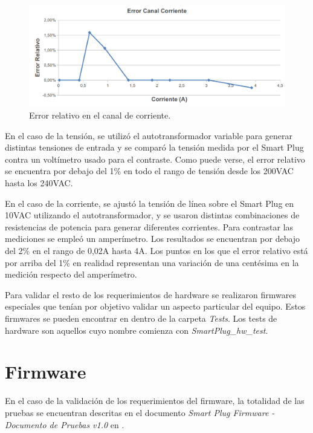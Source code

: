 \begin{figure}[h]
	\centering
	\includegraphics[width=14cm]{./Figures/4_1_1_error_canal_corriente.png}
	\caption{Error relativo en el canal de corriente.}
	\label{fig:error_canal_corriente}
\end{figure}

En el caso de la tensión, se utilizó el autotransformador variable para generar distintas tensiones de entrada y se comparó la tensión medida por el Smart Plug contra un voltímetro usado para el contraste. Como puede verse, el error relativo se encuentra por debajo del 1\% en todo el rango de tensión desde los 200VAC hasta los 240VAC.

En el caso de la corriente, se ajustó la tensión de línea sobre el Smart Plug en 10VAC utilizando el autotransformador, y se usaron distintas combinaciones de resistencias de potencia para generar diferentes corrientes. Para contrastar las mediciones se empleó un amperímetro. Los resultados se encuentran por debajo del 2\% en el rango de 0,02A hasta 4A. Los puntos en los que el error relativo está por arriba del 1\% en realidad representan una variación de una centésima en la medición respecto del amperímetro.

Para validar el resto de los requerimientos de hardware se realizaron firmwares especiales que tenían por objetivo validar un aspecto particular del equipo. Estos firmwares se pueden encontrar en \citep{repo_firmware} dentro de la carpeta \textit{Tests}. Los tests de hardware son aquellos cuyo nombre comienza con \textit{SmartPlug\_hw\_test}.


\section{Firmware}
\label{sec:validacion_firmware}

En el caso de la validación de los requerimientos del firmware, la totalidad de las pruebas se encuentran descritas en el documento \textit{Smart Plug Firmware - Documento de Pruebas v1.0} en \citep{repo_docu_firmware}.

